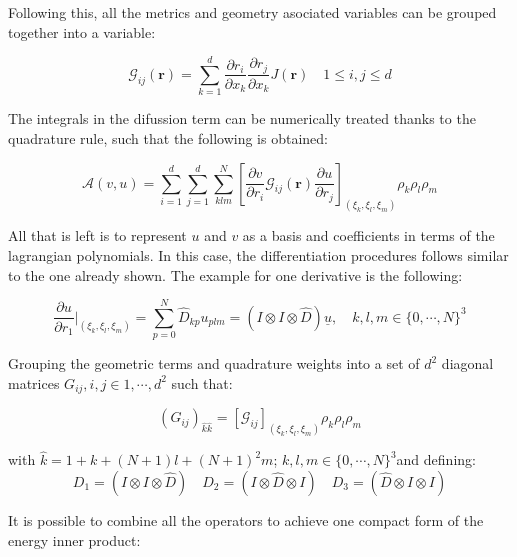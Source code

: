 \documentclass[
  a4paper,
  10pt]{article}
\begin{document}
Following this, all the metrics and geometry asociated variables can be
grouped together into a variable:

\begin{equation}
\mathcal{G}_{ij}(\textbf{r})=\sum_{k=1}^{d}\frac{\partial r_i}{\partial x_k}\frac{\partial r_j}{\partial x_k} J(\textbf{r}) \quad 1 \leq i,j \leq d
\end{equation}

The integrals in the difussion term can be numerically treated thanks to
the quadrature rule, such that the following is obtained:

\begin{equation}
    \mathcal{A}(v,u)=\sum_{i=1}^{d} \sum_{j=1}^{d} \sum_{klm}^{N} \left[ \frac{\partial v}{\partial r_i}  \mathcal{G}_{ij}(\textbf{r}) \frac{\partial u}{\partial r_j} \right]_{(\xi_k,\xi_l,\xi_m)} \rho_k \rho_l \rho_m 
\end{equation}

All that is left is to represent \(u\) and \(v\) as a basis and
coefficients in terms of the lagrangian polynomials. In this case, the
differentiation procedures follows similar to the one already shown. The
example for one derivative is the following:

\begin{equation}
    \frac{\partial u}{\partial r_1}\rvert_{(\xi_k,\xi_l,\xi_m)}=\sum_{p=0}^{N} \hat{D}_{kp}u_{plm}= (I \otimes I \otimes \hat{D})\underline{u}, \quad k,l,m \in \{0, \cdots, N\}^{3}
\end{equation}

Grouping the geometric terms and quadrature weights into a set of
\(d^2\) diagonal matrices \(G_{ij}, i,j \in {1,\cdots, d^2}\) such that:

\begin{equation}
    (G_{ij})_{\hat{k}\hat{k}}=\left[ \mathcal{G}_{ij}  \right]_{(\xi_k,\xi_l,\xi_m)} \rho_k \rho_l \rho_m
\end{equation}

with \(\hat{k}=1+k+(N+1)l+(N+1)^{2}m\);
\(k,l,m \in \{0, \cdots, N \}^{3}\)and defining: \begin{equation}
    D_1=(I \otimes I \otimes \hat{D}) \quad D_2=(I \otimes \hat{D} \otimes I) \quad D_3=(\hat{D} \otimes I \otimes I)
\end{equation}

It is possible to combine all the operators to achieve one compact form
of the energy inner product:
\end{document}
